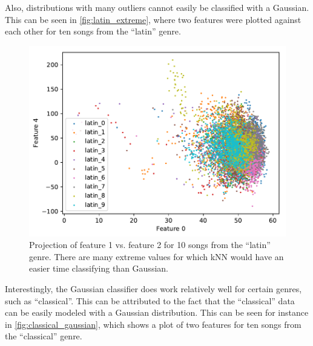 \documentclass[a4paper,titlepage]{article}
\begin{document}
	Also, distributions with many outliers cannot easily be classified with a Gaussian. This can be seen in \autoref{fig:latin_extreme}, where two features were plotted against each other for ten songs from the ``latin'' genre.
	
	\begin{figure}[!htb]
		\centering
		\includegraphics[width=\columnwidth]{plots/latin_extreme.pdf}
		\caption
		{Projection of feature 1 vs. feature 2 for 10 songs from the ``latin'' genre. There are many extreme values for which kNN would have an easier time classifying than Gaussian.}
		\label{fig:latin_extreme}
	\end{figure}

	Interestingly, the Gaussian classifier does work relatively well for certain genres, such as ``classical''. This can be attributed to the fact that the ``classical'' data can be easily modeled with a Gaussian distribution. This can be seen for instance in \autoref{fig:classical_gaussian}, which shows a plot of two features for ten songs from the ``classical'' genre.
	
	
\end{document}
